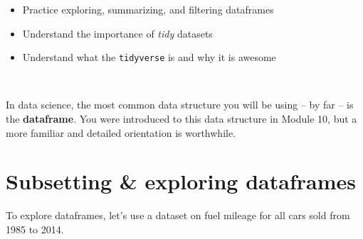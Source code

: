 \documentclass[
]{book}
\providecommand{\tightlist}{%
  \setlength{\itemsep}{0pt}\setlength{\parskip}{0pt}}
\begin{document}
\begin{itemize}
\tightlist
\item
  Practice exploring, summarizing, and filtering dataframes
\item
  Understand the importance of \emph{tidy} datasets
\item
  Understand what the \texttt{tidyverse} is and why it is awesome
\end{itemize}

~

In data science, the most common data structure you will be using -- by far -- is the \textbf{dataframe}. You were introduced to this data structure in Module 10, but a more familiar and detailed orientation is worthwhile.

\hypertarget{subsetting-exploring-dataframes}{%
\section*{Subsetting \& exploring dataframes}\label{subsetting-exploring-dataframes}}

To explore dataframes, let's use a dataset on fuel mileage for all cars sold from 1985 to 2014.
\end{document}
